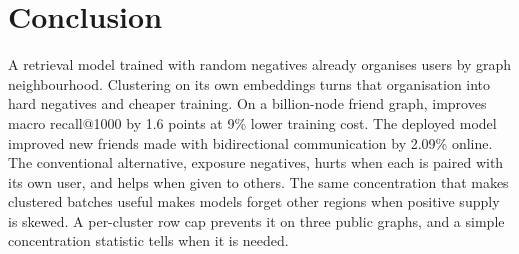 \section{Conclusion}
\label{sec:conclusion}

A retrieval model trained with random negatives already organises users by graph neighbourhood. Clustering on its own
embeddings turns that organisation into hard negatives and cheaper training. On a billion-node friend graph, \ours{}
improves macro recall@1000 by 1.6 points at 9\% lower training cost. The deployed model
improved new friends made with bidirectional communication by 2.09\% online. The conventional alternative, exposure
negatives, hurts when each is paired with its own user, and helps when given to others. The same concentration that makes clustered batches useful makes models forget other regions when
positive supply is skewed. A per-cluster row cap prevents it on three public graphs, and a simple concentration
statistic tells when it is needed.
